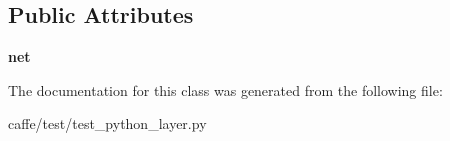 \subsection*{Public Attributes}
\begin{DoxyCompactItemize}
\item 
\hypertarget{classtest__python__layer_1_1_test_python_layer_a512551c8f5cda5a451a198b1d73a8295}{}{\bfseries net}\label{classtest__python__layer_1_1_test_python_layer_a512551c8f5cda5a451a198b1d73a8295}

\end{DoxyCompactItemize}


The documentation for this class was generated from the following file\+:\begin{DoxyCompactItemize}
\item 
caffe/test/test\+\_\+python\+\_\+layer.\+py\end{DoxyCompactItemize}
